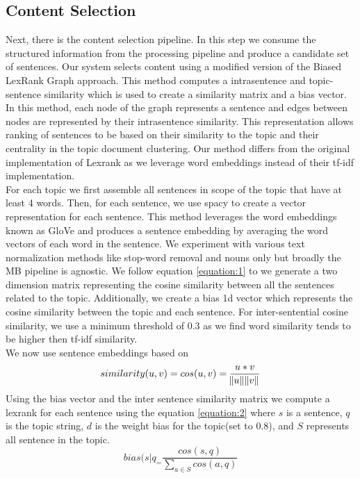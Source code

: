 \documentclass[11pt,a4paper]{article}
\begin{document}
\subsection{Content Selection}
Next, there is the content selection pipeline. In this step we consume the structured information from the processing pipeline and produce a candidate set of sentences. Our system selects content using a modified version of the Biased LexRank Graph approach. This method computes a intrasentence and topic-sentence similarity which is used to create a similarity matrix and a bias vector. In this method, each node of the graph represents a sentence and edges between nodes are represented by their intrasentence similarity. This representation allows ranking of sentences to be based on their similarity to the topic and their centrality in the topic document clustering. Our method differs from the original implementation of Lexrank\cite{otterbacher-etal-2005-using} as we leverage word embeddings instead of their tf-idf implementation. \\ 
For each topic we first assemble all sentences in scope of the topic that have at least 4 words. Then, for each sentence, we use spacy to create a vector representation for each sentence. This method leverages the word embeddings known as GloVe \cite{Pennington2014GloveGV} and produces a sentence embedding by averaging the word vectors of each word in the sentence. We experiment with various text normalization methods like stop-word removal and nouns only but broadly the MB pipeline is agnostic. We follow equation \ref{equation:1} to we generate a two dimension matrix representing the cosine similarity between all the sentences related to the topic. Additionally, we create a bias 1d vector which represents the cosine similarity between the topic and each sentence. For inter-sentential cosine similarity, we use a minimum threshold of 0.3 as we find word similarity tends to be higher then tf-idf similarity.\\
We now use sentence embeddings based on \cite{reimers-2019-sentence-bert}
\begin{equation}
\label{equation:1}
similarity(u,v) = cos(u,v) = \frac{u * v}{\norm{u}\norm{v}}
\end{equation}
Using the bias vector and the inter sentence similarity matrix we compute a lexrank for each sentence using the equation \ref{equation:2} where $s$ is a sentence, $q$ is the topic string, $d$ is the weight bias for the topic(set to 0.8), and $S$ represents all sentence in the topic. 
\begin{equation}
   bias(s|q_ =  \frac{cos(s,q)}{\sum_{a \in S} cos(a,q) }
\end{equation}
\end{document}
